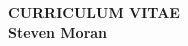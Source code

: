 \documentclass[11pt]{article}
\begin{document}


\begin{center}
{\bf CURRICULUM VITAE\\Steven Moran}\\

\vskip 12pt

\begin{tabular}{ll}
%


\end{tabular}
\end{center}
\end{document}
